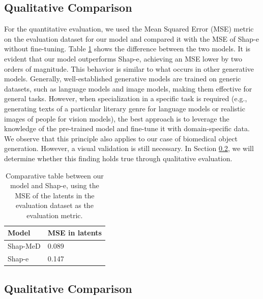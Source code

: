 \documentclass[journal]{IEEEtran}
\begin{document}
\subsection{Qualitative Comparison}

For the quantitative evaluation, we used the Mean Squared Error (MSE) metric on the evaluation dataset for our model and compared it with the MSE of Shap-e without fine-tuning. Table \ref{tab:MSE} shows the difference between the two models. It is evident that our model outperforms Shap-e, achieving an MSE lower by two orders of magnitude. This behavior is similar to what occurs in other generative models. Generally, well-established generative models are trained on generic datasets, such as language models and image models, making them effective for general tasks. However, when specialization in a specific task is required (e.g., generating texts of a particular literary genre for language models or realistic images of people for vision models), the best approach is to leverage the knowledge of the pre-trained model and fine-tune it with domain-specific data.  \\

We observe that this principle also applies to our case of biomedical object generation. However, a visual validation is still necessary. In Section \ref{ev_cualitativa}, we will determine whether this finding holds true through qualitative evaluation.

\begin{table}[h]
    \centering
    \renewcommand{\arraystretch}{1.5} %
    \setlength{\tabcolsep}{20pt}      %
    \begin{tabular}{@{} l l @{}}
        \toprule
        \textbf{Model} & \textbf{MSE in latents} \\
        \midrule
        Shap-MeD & 0.089 \\
        Shap-e & 0.147 \\
        \bottomrule
    \end{tabular}
    \caption{Comparative table between our model and Shap-e, using the MSE of the latents in the evaluation dataset as the evaluation metric.}
    \label{tab:MSE}
\end{table}

\subsection{Qualitative Comparison} 
\label{ev_cualitativa}
\end{document}
